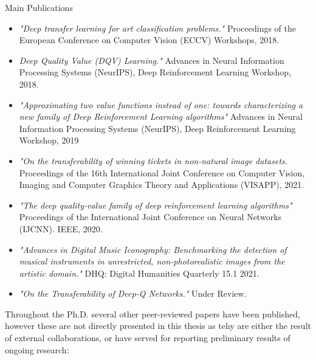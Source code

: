 \begin{remark}{Main Publications}
\begin{itemize}
	\item \citet{sabatelli2018deep} \textit{"Deep transfer learning for art classification problems."} Proceedings of the European Conference on Computer Vision (ECCV) Workshops, 2018.
	\item \citet{sabatelli2018deepqv} \textit{Deep Quality Value (DQV) Learning."} Advances in Neural Information Processing Systems (NeurIPS), Deep Reinforcement Learning Workshop, 2018.
	\item \citet{sabatelli2019approximating}  \textit{"Approximating two value functions instead of one: towards characterizing a new family of Deep Reinforcement Learning algorithms"} Advances in Neural Information Processing Systems (NeurIPS), Deep Reinforcement Learning Workshop, 2019	
	\item \citet{sabatelli2020transferability} \textit{"On the transferability of winning tickets in non-natural image datasets.} Proceedings of the 16th International Joint Conference on Computer Vision, Imaging and Computer Graphics Theory and Applications (VISAPP), 2021.
	\item \citet{sabatelli2020deep} \textit{"The deep quality-value family of deep reinforcement learning algorithms"} Proceedings of the International Joint Conference on Neural Networks (IJCNN). IEEE, 2020.
	\item \citet{sabatelli2021advances} \textit{"Advances in Digital Music Iconography: Benchmarking the detection of musical instruments in unrestricted, non-photorealistic images from the artistic domain."} DHQ: Digital Humanities Quarterly 15.1 2021.
	\item \citet{sabatelli2021transferability} \textit{"On the Transferability of Deep-Q Networks."} Under Review. 
\end{itemize}
\end{remark}

Throughout the Ph.D. several other peer-reviewed papers have been published, however these are not directly presented in this thesis as tehy are either the result of external collaborations, or have served for reporting preliminary results of ongoing research:

